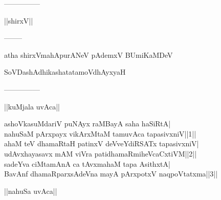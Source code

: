 \documentclass{article}
\begin{document}
\begin{center}
---------------
\end{center}

\begin{center}
||shirxV||
\end{center}

\begin{center}
--------
\end{center}

\begin{center}
atha shirxVmahApurANeV pAdemxV BUmiKaMDeV
\end{center}

\begin{center}
SoVDashAdhikashatatamoVdhAyxyaH
\end{center}

\begin{center}
---------------
\end{center}

\begin{center}
||kuMjala uvAca||
\end{center}

ashoVkasuMdariV puNAyx raMBayA saha haSiRtA|\\
nahuSaM pArxpayx vikArxMtaM tamuvAca tapasivxniV||1||\\
ahaM teV dhamaRtaH patinxV deVveYdiRSATx tapasivxniV|\\
udAvxhayasavx mAM viVra patidhamaRmiheVcaCxtiVM||2||\\
sadeYva ciMtamAnA ca tAvxmahaM tapa AsithxtA|\\
BavAnf dhamaRparxsAdeVna mayA pArxpotxV naqpoVtatxma||3||\\

\begin{center}
||nahuSa uvAca||
\end{center}
\end{document}
